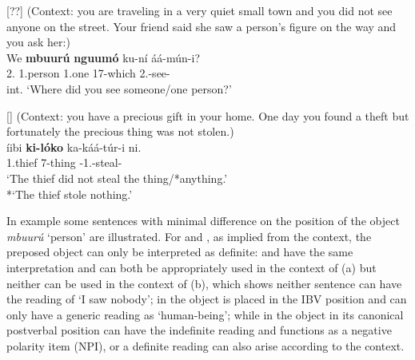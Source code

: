 \documentclass[output=paper,colorlinks,citecolor=brown,
]{langscibook}
\begin{document}
\begin{exe}
\ex
[??]{
\label{110}
 (Context: you are traveling in a very quiet small town and you did not see anyone on the street. Your friend said she saw a person's figure on the way and you ask her:)\\
\gll
We \textbf{mbuurú} \textbf{nguumó} ku-ní áá-mún-i?\\
2\Sg{}.\Pro{} 1.person 1.one 17-which 2\Sg{}.\Pst{}-see-\Pst{}\\
\trans int. ‘Where did you see someone/one person?’
}

\ex
[]{
\label{111}
 (Context: you have a precious gift in your home. One day you found a theft but fortunately the precious thing was not stolen.)\\
\gll
{\textltailm}íibi \textbf{ki-lóko} ka-káá-túr-i ni.\\
1.thief 7-thing \Neg{}-1\Sm{}.\Pst{}-steal-\Pst{} \Neg{}\\
\trans ‘The thief did not steal the thing/*anything.’\\
    *‘The thief stole nothing.’    
}

\end{exe}
In example  some sentences with minimal difference on the position of the object \textit{mbuurú} `person' are illustrated. For  and , as implied from the context, the preposed object can only be interpreted as definite:  and  have the same interpretation and can both be appropriately used in the context of (a) but neither can be used in the context of (b), which shows neither sentence can have the reading of `I saw nobody'; in  the object is placed in the IBV position and can only have a generic reading as `human-being'; while in  the object in its canonical postverbal position can have the indefinite reading and functions as a negative polarity item (NPI), or a definite reading can also arise according to the context.\largerpage[2]
\end{document}
